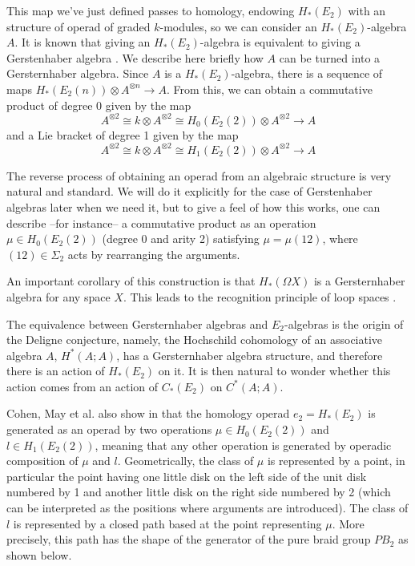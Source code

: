 \documentclass[TFM.tex]{subfiles}
\begin{document}
This map we've just defined passes to homology, endowing $H_*(E_2)$ with an structure of operad of graded $k$-modules, so we can consider an $H_*(E_2)$-algebra $A$. It is known that giving an $H_*(E_2)$-algebra is equivalent to giving a Gerstenhaber algebra \cite{cuentas}. We describe here briefly how $A$ can be turned into a Gersternhaber algebra. Since $A$ is a $H_*(E_2)$-algebra, there is a sequence of maps $H_*(E_2(n))\otimes A^{\otimes n}\to A$. From this, we can obtain a commutative product of degree 0 given by the map
\[
A^{\otimes 2}\cong k\otimes A^{\otimes 2}\cong H_0(E_2(2))\otimes A^{\otimes 2}\to A
\]
and a Lie bracket of degree 1 given by the map
\[
A^{\otimes 2}\cong k\otimes A^{\otimes 2}\cong H_1(E_2(2))\otimes A^{\otimes 2}\to A
\]

The reverse process of obtaining an operad from an algebraic structure is very natural and standard. We will do it explicitly for the case of Gerstenhaber algebras later when we need it, but to give a feel of how this works, one can describe --for instance-- a commutative product as an operation $\mu\in H_0(E_2(2))$ (degree 0 and arity 2) satisfying $\mu=\mu(12)$, where $(12)\in\Sigma_2$ acts by rearranging the arguments. 

An important corollary of this construction is that $H_*(\Omega X)$ is a Gersternhaber algebra for any space $X$. This leads to the recognition principle of loop spaces \cite{May}.

The equivalence between Gersternhaber algebras and $E_2$-algebras is the origin of the Deligne conjecture, namely, the Hochschild cohomology of an associative algebra $A$, $H^*(A;A)$, has a Gersternhaber algebra structure, and therefore there is an action of $H_*(E_2)$ on it. It is then natural to wonder whether this action comes from an action of $C_*(E_2)$ on $C^*(A;A)$. 

Cohen, May et al. also show in \cite{cuentas} that the homology operad $e_2=H_*(E_2)$ is generated as an operad by two operations $\mu\in H_0(E_2(2))$ and $l\in H_1(E_2(2))$, meaning that any other operation is generated by operadic composition of $\mu$ and $l$. Geometrically, the class of $\mu$ is represented by a point, in particular the point having one little disk on the left side of the unit disk numbered by 1 and another little disk on the right side numbered by 2 (which can be interpreted as the positions where arguments are introduced). The class of $l$ is represented by a closed path based at the point representing $\mu$. More precisely, this path has the shape of the generator of the pure braid group $PB_2$ as shown below.
\end{document}
